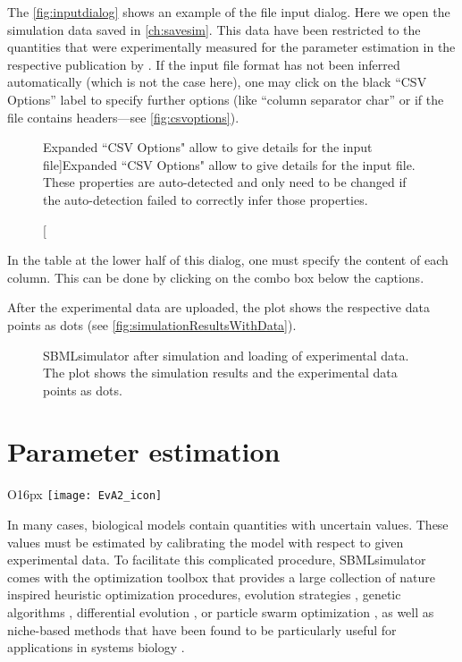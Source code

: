 The \vref{fig:inputdialog} shows an example of the file input dialog. Here we open the simulation data saved in \vref{ch:savesim}.
This data have been restricted to the quantities that were experimentally measured for the parameter estimation in the respective publication by \citet{Bucher2011}.
If the input file format has not been inferred automatically (which is not the case here), one may click on the black ``CSV Options'' label to specify further options (like ``column separator char'' or if the file contains headers---see \vref{fig:csvoptions}).
\begin{figure}[h]
\centering
{}
\caption[Expanded ``CSV Options" allow to give details for the input file]{Expanded ``CSV Options" allow to give details for the input file.
These properties are auto-detected and only need to be changed if the auto-detection failed to correctly infer those properties.}
\label{fig:csvoptions}
\end{figure}

In the table at the lower half of this dialog, one must specify the content of each column.
This can be done by clicking on the combo box below the captions. 

After the experimental data are uploaded, the plot shows the respective data points as dots (see \vref{fig:simulationResultsWithData}).
\begin{figure}[t]
\centering
{}
\caption[SBMLsimulator after simulation and loading of experimental data]{SBMLsimulator after simulation and loading of experimental data.
The plot shows the simulation results and the experimental data points as dots.
}
\label{fig:simulationResultsWithData}
\end{figure}


\section{Parameter estimation}
\begin{wrapfigure}{O}{16px}
\vspace{\wrapfigspace}
\texttt{[image: EvA2\_icon]}
\end{wrapfigure}
In many cases, biological models contain quantities with uncertain values.
These values must be estimated by calibrating the model with respect to given experimental data.
To facilitate this complicated procedure, SBMLsimulator comes with the optimization toolbox \EvA that provides a large collection of nature inspired heuristic optimization procedures, \eg evolution strategies \citep{Rechenberg1973,
Schwefel1975}, genetic algorithms \citep{Holland1975}, differential evolution \citep{Storn96Usage}, or particle swarm optimization \citep{ClercKennedy02, Clerc2005}, as well as niche-based methods that have been found to be particularly useful for applications in systems biology \citep{Kron09NichingGCB}.

